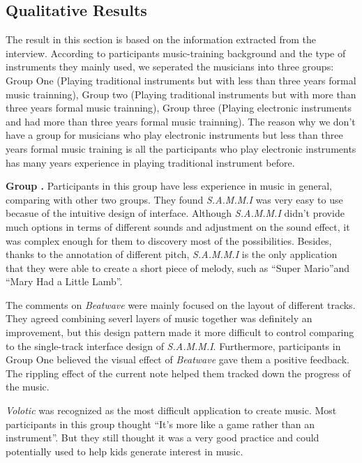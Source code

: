 \subsection{Qualitative Results}

The result in this section is based on the information extracted from the interview. According to participants music-training background and the type of instruments they mainly used, we seperated the musicians into three groups: Group One (Playing traditional instruments but with less than three years formal music trainning), Group two (Playing traditional instruments but with more than three years formal music trainning), Group three (Playing electronic instruments and had more than three years formal music trainning). The reason why we don't have a group for musicians who play electronic instruments but less than three years formal music training is all the participants who play electronic instruments has many years experience in playing traditional instrument before.

\textbf{Group .} Participants in this group have less experience in music in general, comparing with other two groups. They found \textit{S.A.M.M.I} was very easy to use becasue of the intuitive design of interface. Although \textit{S.A.M.M.I} didn't provide much options in terms of different sounds and adjustment on the sound effect, it was complex enough for them to discovery most of the possibilities. Besides, thanks to the annotation of different pitch, \textit{S.A.M.M.I} is the only application that they were able to create a short piece of melody, such as \textquotedblleft{Super Mario}\textquotedblright and \textquotedblleft{Mary Had a Little Lamb}\textquotedblright.

The comments on \textit{Beatwave} were mainly focused on the layout of different tracks. They agreed combining severl layers of music together was definitely an improvement, but this design pattern made it more difficult to control comparing to the single-track interface design of \textit{S.A.M.M.I}. Furthermore, participants in Group One believed the visual effect of \textit{Beatwave} gave them a positive feedback. The rippling effect of the current note helped them tracked down the progress of the music.

\textit{Volotic} was recognized as the most difficult application to create music. Most participants in this group thought \textquotedblleft{It's more like a game rather than an instrument}\textquotedblright. But they still thought it was a very good practice and could potentially used to help kids generate interest in music.

